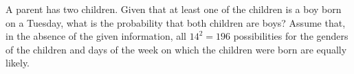 \item
A parent has two children. Given that at least one of the children is a boy born on a Tuesday, what is the probability that both children are boys? Assume that, in the absence of the given information, all $14^2=196$ possibilities for the genders of the children and days of the week on which the children were born are equally likely. 